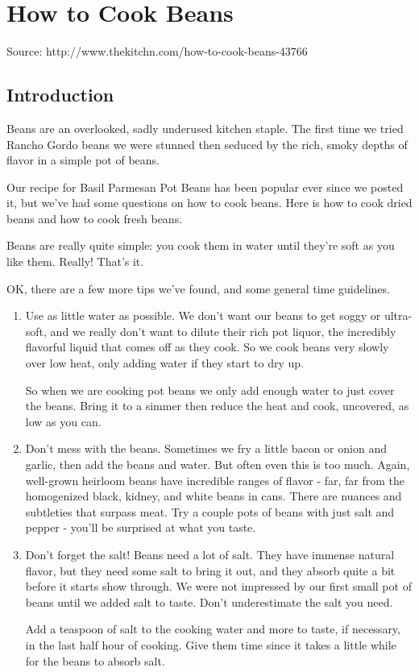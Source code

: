 \section{How to Cook Beans}
Source: http://www.thekitchn.com/how-to-cook-beans-43766

\subsection{Introduction}
Beans are an overlooked, sadly underused kitchen staple.
 The first time we tried Rancho Gordo beans we were stunned then seduced by the rich, smoky depths of flavor in a simple pot of beans.

Our recipe for Basil Parmesan Pot Beans has been popular ever since we posted it, but we've had some questions on how to cook beans.
Here is how to cook dried beans and how to cook fresh beans.

Beans are really quite simple: you cook them in water until they're soft as you like them.
Really!
 That's it.

OK, there are a few more tips we've found, and some general time guidelines.

\begin{enumerate}
    \item Use as little water as possible.
          We don't want our beans to get soggy or ultra-soft, and we really don't want to dilute their rich pot liquor, the incredibly flavorful liquid that comes off as they cook.
          So we cook beans very slowly over low heat, only adding water if they start to dry up.

          So when we are cooking pot beans we only add enough water to just cover the beans.
          Bring it to a simmer then reduce the heat and cook, uncovered, as low as you can.

    \item Don't mess with the beans.
          Sometimes we fry a little bacon or onion and garlic, then add the beans and water.
          But often even this is too much. Again, well-grown heirloom beans have incredible ranges of flavor - far, far from the homogenized black, kidney, and white beans in cans.
          There are nuances and subtleties that surpass meat.
          Try a couple pots of beans with just salt and pepper - you'll be surprised at what you taste.

    \item Don't forget the salt! Beans need a lot of salt.
          They have immense natural flavor, but they need some salt to bring it out, and they absorb quite a bit before it starts show through.
          We were not impressed by our first small pot of beans until we added salt to taste.
          Don't underestimate the salt you need.

        Add a teaspoon of salt to the cooking water and more to taste, if necessary, in the last half hour of cooking.
        Give them time since it takes a little while for the beans to absorb salt.
\end{enumerate}


